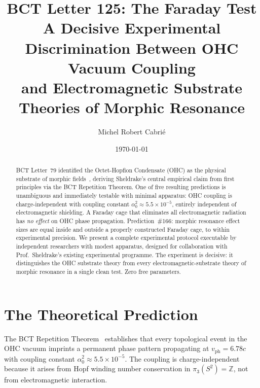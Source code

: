\documentclass[aps,prl,twocolumn,superscriptaddress,floatfix]{revtex4-2}
\begin{document}
\title{BCT Letter 125: The Faraday Test\\
\large A Decisive Experimental Discrimination Between OHC Vacuum Coupling\\
\large and Electromagnetic Substrate Theories of Morphic Resonance}

\author{Michel Robert Cabri\'{e}}
\date{\today}

\begin{abstract}
BCT Letter~79 identified the Octet-Hopfion Condensate (OHC) as the
physical substrate of morphic fields~\cite{Sheldrake1981}, deriving
Sheldrake's central empirical claim from first principles via the BCT
Repetition Theorem. One of five resulting predictions is unambiguous and
immediately testable with minimal apparatus: OHC coupling is
charge-independent with coupling constant $\alpha_0^2 \approx 5.5 \times
10^{-5}$, entirely independent of electromagnetic shielding. A Faraday
cage that eliminates all electromagnetic radiation has
\emph{no effect} on OHC phase propagation.
Prediction~\#166: morphic resonance effect sizes are equal inside and
outside a properly constructed Faraday cage, to within experimental
precision. We present a complete experimental protocol
executable by independent researchers with modest apparatus, designed for
collaboration with Prof.\ Sheldrake's existing experimental programme.
The experiment is decisive: it distinguishes the OHC substrate theory from
every electromagnetic-substrate theory of morphic resonance in a single
clean test. Zero free parameters.
\end{abstract}

\maketitle

\section{The Theoretical Prediction}

The BCT Repetition Theorem~\cite{BCT_L79} establishes that every
topological event in the OHC vacuum imprints a permanent phase pattern
propagating at $v_\mathrm{ph} = 6.78c$ with coupling constant
$\alpha_0^2 \approx 5.5 \times 10^{-5}$. The coupling is charge-independent
because it arises from Hopf winding number conservation in
$\pi_3(S^2) = \mathbb{Z}$, not from electromagnetic interaction.
\end{document}
